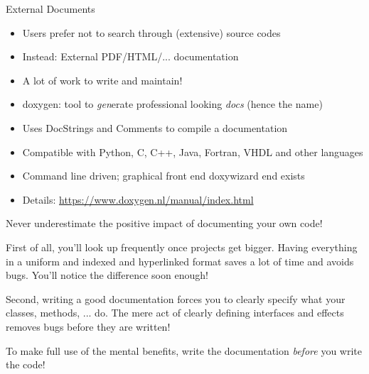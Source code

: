 
\begin{frame}{External Documents}
%
\begin{itemize}
\item Users prefer not to search through (extensive) source codes
\item Instead: External PDF/HTML/... documentation
\item A lot of work to write and maintain!
\item doxygen: tool to \emph{gen}erate professional looking \emph{docs} (hence the name)
\item Uses DocStrings and Comments to compile a documentation
\item Compatible with Python, C, C++, Java, Fortran, VHDL and other languages
\item Command line driven; graphical front end doxywizard end exists
\item Details: \url{https://www.doxygen.nl/manual/index.html}
\end{itemize}
%
\end{frame}


\begin{frame}
%
\begin{hintbox}
Never underestimate the positive impact of documenting your own code!

\vspace{4pt}
First of all, you'll look up frequently once projects get bigger. Having everything in a uniform and indexed and hyperlinked format saves a lot of time and avoids bugs. You'll notice the difference soon enough!

\vspace{4pt}
Second, writing a good documentation forces you to clearly specify what your classes, methods, ... do. The mere act of clearly defining interfaces and effects removes bugs before they are written!

\vspace{4pt}
To make full use of the mental benefits, write the documentation \emph{before} you write the code!
\end{hintbox}
%
\end{frame}


